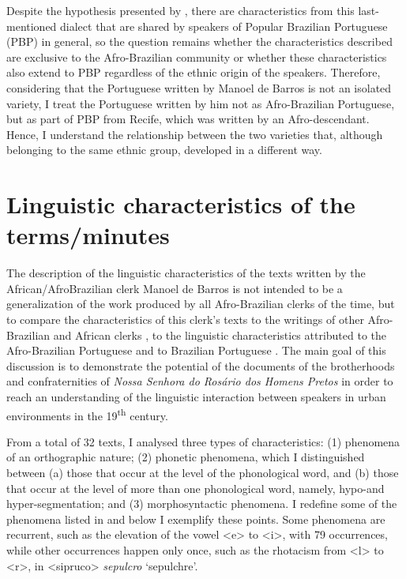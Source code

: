 \documentclass[output=paper,colorlinks,citecolor=brown]{langscibook}
\begin{document}
Despite the hypothesis presented by \citet{Mattos_e_Silva_2004}, there are characteristics from this last-mentioned dialect that are shared by speakers of Popular Brazilian Portuguese (PBP) in general, so the question remains whether the characteristics described are exclusive to the Afro-Brazilian community or whether these characteristics also extend to PBP regardless of the ethnic origin of the speakers. Therefore, considering that the Portuguese written by Manoel de Barros is not an isolated variety, I treat the Portuguese written by him not as Afro-Brazilian Portuguese, but as part of PBP from Recife, which was written by an Afro-descendant. Hence, I understand the relationship between the two varieties that, although belonging to the same ethnic group, developed in a different way.


\section{Linguistic characteristics of the terms/minutes}

The description of the linguistic characteristics of the texts written by the African\slash AfroBrazilian clerk Manoel de Barros is not intended to be a generalization of the work produced by all Afro-Brazilian clerks of the time, but to compare the characteristics of this clerk’s texts to the writings of other Afro-Brazilian and African clerks \citep{Oliveira_2006}, to the linguistic characteristics attributed to the Afro-Brazilian Portuguese \citep{Lucchesi_Baxter_Ribeiro_2009} and to Brazilian Portuguese \citep{Petter_2009}. The main goal of this discussion is to demonstrate the potential of the documents of the brotherhoods and confraternities of \emph{Nossa Senhora do Rosário dos Homens Pretos} in order to reach an understanding of the linguistic interaction between speakers in urban environments in the 19\textsuperscript{th} century.

From a total of 32 texts, I analysed three types of characteristics:
(1) phenomena of an orthographic nature;
(2) phonetic phenomena, which I distinguished between (a) those that occur at the level of the phonological word, and (b) those that occur at the level of more than one phonological word, namely, hypo-and hyper-segmentation; and
(3) morphosyntactic phenomena. I redefine some of the phenomena listed in \citet{Ziober_2014} and below I exemplify these points. Some phenomena are recurrent, such as the elevation of the vowel <e> to <i>, with 79 occurrences, while other occurrences happen only once, such as the rhotacism from <l> to <r>, in <sipruco> \emph{sepulcro} ‘sepulchre’.
\end{document}
